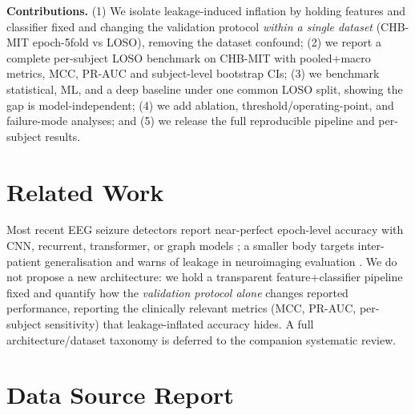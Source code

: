 \documentclass[10pt,journal,twocolumn]{IEEEtran}
\begin{document}
\textbf{Contributions.} (1) We isolate leakage-induced inflation by holding features and classifier fixed and changing the validation protocol \emph{within a single dataset} (CHB-MIT epoch-5fold vs LOSO), removing the dataset confound; (2) we report a complete per-subject LOSO benchmark on CHB-MIT with pooled+macro metrics, MCC, PR-AUC and subject-level bootstrap CIs; (3) we benchmark statistical, ML, and a deep baseline under one common LOSO split, showing the gap is model-independent; (4) we add ablation, threshold/operating-point, and failure-mode analyses; and (5) we release the full reproducible pipeline and per-subject results.

\section{Related Work}
Most recent EEG seizure detectors report near-perfect epoch-level accuracy with CNN, recurrent, transformer, or graph models \citep{ep241003385,ep251108861,ep250215198}; a smaller body targets inter-patient generalisation \citep{ep250515203} and warns of leakage in neuroimaging evaluation \citep{ep210203336}. We do not propose a new architecture: we hold a transparent feature+classifier pipeline fixed and quantify how the \emph{validation protocol alone} changes reported performance, reporting the clinically relevant metrics (MCC, PR-AUC, per-subject sensitivity) that leakage-inflated accuracy hides. A full architecture/dataset taxonomy is deferred to the companion systematic review.

\section{Data Source Report}
\end{document}
